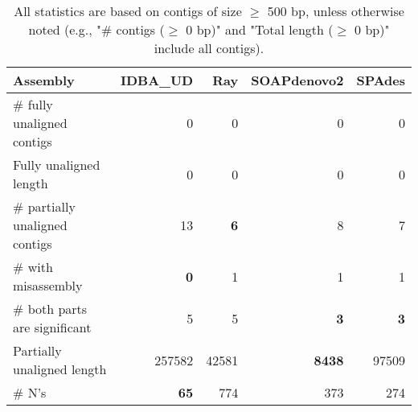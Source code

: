 \documentclass[12pt,a4paper]{article}
\begin{document}
\begin{table}[ht]
\begin{center}
\caption{All statistics are based on contigs of size $\geq$ 500 bp, unless otherwise noted (e.g., "\# contigs ($\geq$ 0 bp)" and "Total length ($\geq$ 0 bp)" include all contigs).}
\begin{tabular}{|l*{4}{|r}|}
\hline
Assembly & IDBA\_UD & Ray & SOAPdenovo2 & SPAdes \\ \hline
\# fully unaligned contigs & 0 & 0 & 0 & 0 \\ \hline
Fully unaligned length & 0 & 0 & 0 & 0 \\ \hline
\# partially unaligned contigs & 13 & {\bf 6} & 8 & 7 \\ \hline
\hspace{5mm}\# with misassembly & {\bf 0} & 1 & 1 & 1 \\ \hline
\hspace{5mm}\# both parts are significant & 5 & 5 & {\bf 3} & {\bf 3} \\ \hline
Partially unaligned length & 257582 & 42581 & {\bf 8438} & 97509 \\ \hline
\# N's & {\bf 65} & 774 & 373 & 274 \\ \hline
\end{tabular}
\end{center}
\end{table}
\end{document}
